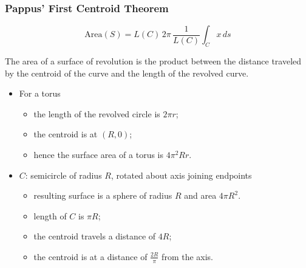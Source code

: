 \begin{frame}
  \frametitle{Pappus' First Centroid Theorem}

$$\text{Area}(S) = L(C)\, 2\pi \,\frac{1}{L(C)}\int_C x \,ds$$
\pause
\begin{theorem}
   The area of a surface of revolution is the product between the distance traveled by the centroid of the curve and the length of the revolved curve.
 \end{theorem}

  \begin{itemize}
    \item \pause For a torus
     \begin{itemize}
       \item \pause the length of the revolved circle is $2\pi r$;
       \item \pause the centroid is at $(R,0)$;
       \item \pause hence the surface area of a torus is $4\pi^2 Rr$.
     \end{itemize}
    \item \pause $C$: semicircle of radius $R$, rotated about axis joining endpoints
         \begin{itemize}
           \item \pause resulting surface is a sphere of radius $R$ and area $4\pi R^2$.
           \item \pause length of $C$ is $\pi R$;
           \item \pause the centroid travels a distance of $4R$;
           \item \pause the centroid is at a distance of $\frac{2R}{\pi}$ from the axis.
         \end{itemize}
  \end{itemize}
\end{frame}

